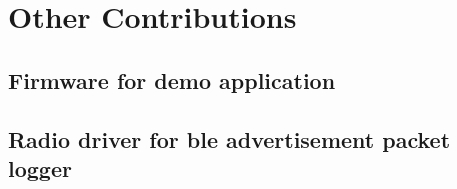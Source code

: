 \chapter{Other Contributions}

\section{Firmware for demo application}

\section{Radio driver for \gls{ble} advertisement packet logger}